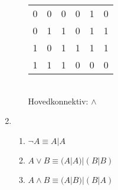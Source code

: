 \documentclass[a4paper, 12pt]{article}  %
\begin{document}
\begin{enumerate}
\begin{enumerate}
\begin{tabular}[t]{c c c c c|c}
            \hline
            0 & 0 & 0 & 0 & 1 & 0 \\
            0 & 1 & 1 & 0 & 1 & 1 \\
            1 & 0 & 1 & 1 & 1 & 1 \\
            1 & 1 & 1 & 0 & 0 & 0 \\
        \end{tabular}
        \\Hovedkonnektiv: \(\land\)
    \end{enumerate}
    \item [\boxed{5}]
    \begin{enumerate}
        \item \(\neg A \equiv A | A\) 
        \item \(A \lor B \equiv (A|A)|(B|B)\)
        \item \(A \land B \equiv (A|B)|(B|A)\)
    \end{enumerate}
\end{enumerate}

\end{document}
